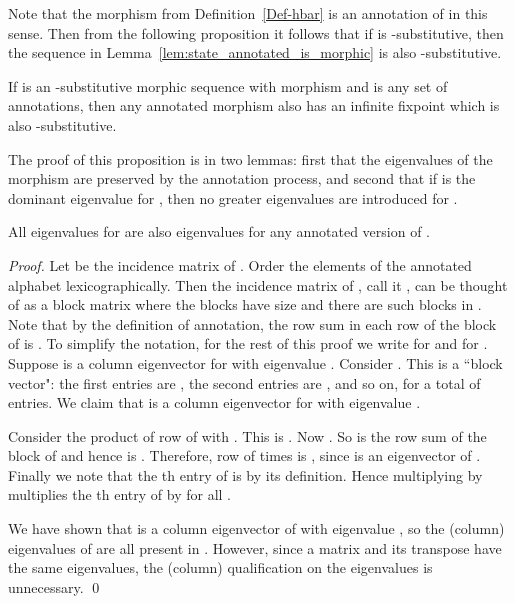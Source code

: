 Note that the morphism  from Definition~\ref{Def-hbar} is an annotation of  in this sense.
Then from the following proposition it follows that if  is -substitutive,
then the sequence  in Lemma~\ref{lem:state_annotated_is_morphic} is also -substitutive. 

\begin{proposition}
If  is an -substitutive morphic sequence with morphism  and  is any set of annotations, then any annotated morphism  also has an infinite fixpoint  which is also -substitutive.
\end{proposition}

The proof of this proposition is in two lemmas: first that the eigenvalues of 
the morphism are preserved by the annotation process, and second that if  is the
 dominant eigenvalue for , then no greater eigenvalues are introduced for .

\begin{lemma}\label{lem:h:oh}
  All eigenvalues for  are also eigenvalues for any annotated version  of .
\end{lemma}

\begin{proof}
  Let  be the incidence matrix of . 
  Order the elements of the annotated alphabet  lexicographically. 
  Then the incidence matrix of , call it , can be thought of 
  as a block matrix where the blocks have size  and there are  such blocks in . 
  Note that by the definition of annotation, the row sum in each row of the  block of  is .
  To simplify the notation, for the rest of this proof we write  for  and  for .
  Suppose  is a column eigenvector for  with eigenvalue . 
  Consider
  . 
  This  is a ``block vector":  the first  entries are , the second  entries are , and so on,
  for a total of  entries. We claim that  is a column eigenvector for  with eigenvalue .

  Consider the product of row  of  with . This is 
  .
Now  .
  So  is the row sum of the  block of  and hence is . Therefore, row  of  times  is ,
  since  is an eigenvector of . Finally we note that 
  the th entry of  is  by its definition. Hence multiplying  by  multiplies the th entry of  by  for all . 

  We have shown  that  is a column eigenvector of  with eigenvalue , so the (column) eigenvalues of  are all present in . However, since a matrix and its transpose have the same eigenvalues, the (column) qualification on the eigenvalues is unnecessary.
  \qed
\end{proof}

